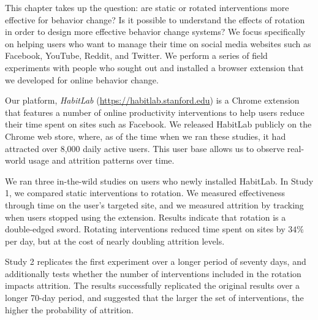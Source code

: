 This chapter takes up the question: are static or rotated interventions more effective for behavior change? Is it possible to understand the effects of rotation in order to design more effective behavior change systems? We focus specifically on helping users who want to manage their time on social media websites such as Facebook, YouTube, Reddit, and Twitter. We perform a series of field experiments with people who sought out and installed a browser extension that we developed for online behavior change. %

Our platform, \textit{HabitLab} (\url{https://habitlab.stanford.edu}) is a Chrome extension that features a number of online productivity interventions to help users reduce their time spent on sites such as Facebook. We released HabitLab publicly on the Chrome web store, where, as of the time when we ran these studies, it had attracted over 8,000 daily active users. This user base allows us to observe real-world usage and attrition patterns over time. %

We ran three in-the-wild studies on users who newly installed HabitLab. In Study 1, we compared static interventions to rotation. %
We measured effectiveness through time on the user's targeted site, and we measured attrition by tracking when users stopped using the extension.
Results indicate that rotation is a double-edged sword. %
Rotating interventions reduced time spent on sites by $34\%$ per day, but at the cost of nearly doubling attrition levels.  %

Study 2 replicates the first experiment over a longer period of seventy days, and additionally tests whether the number of interventions included in the rotation impacts attrition. The results successfully replicated the original results over a longer 70-day period, and suggested that the larger the set of interventions, the higher the probability of attrition.

